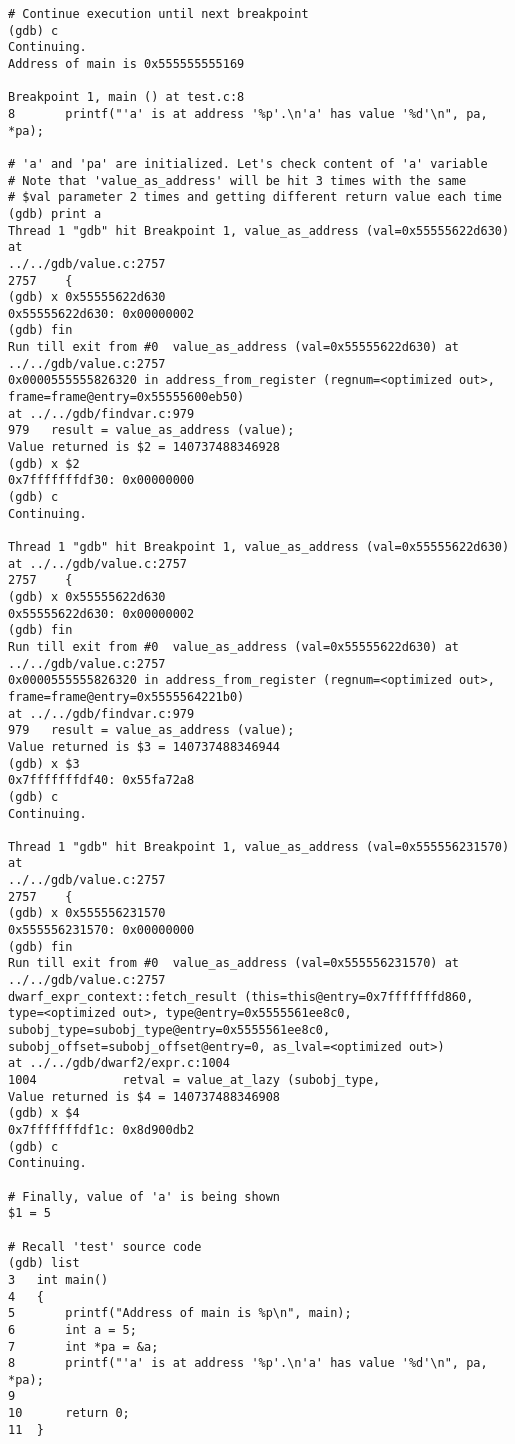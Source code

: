 \documentclass{report}
\begin{document}
\begin{verbatim}
# Continue execution until next breakpoint
(gdb) c
Continuing.
Address of main is 0x555555555169

Breakpoint 1, main () at test.c:8
8		printf("'a' is at address '%p'.\n'a' has value '%d'\n", pa, *pa);

# 'a' and 'pa' are initialized. Let's check content of 'a' variable
# Note that 'value_as_address' will be hit 3 times with the same
# $val parameter 2 times and getting different return value each time
(gdb) print a
Thread 1 "gdb" hit Breakpoint 1, value_as_address (val=0x55555622d630) at 
../../gdb/value.c:2757
2757	{
(gdb) x 0x55555622d630
0x55555622d630:	0x00000002
(gdb) fin
Run till exit from #0  value_as_address (val=0x55555622d630) at 
../../gdb/value.c:2757
0x0000555555826320 in address_from_register (regnum=<optimized out>, 
frame=frame@entry=0x55555600eb50)
at ../../gdb/findvar.c:979
979	  result = value_as_address (value);
Value returned is $2 = 140737488346928
(gdb) x $2
0x7fffffffdf30:	0x00000000
(gdb) c
Continuing.

Thread 1 "gdb" hit Breakpoint 1, value_as_address (val=0x55555622d630) 
at ../../gdb/value.c:2757
2757	{
(gdb) x 0x55555622d630
0x55555622d630:	0x00000002
(gdb) fin
Run till exit from #0  value_as_address (val=0x55555622d630) at 
../../gdb/value.c:2757
0x0000555555826320 in address_from_register (regnum=<optimized out>, 
frame=frame@entry=0x5555564221b0)
at ../../gdb/findvar.c:979
979	  result = value_as_address (value);
Value returned is $3 = 140737488346944
(gdb) x $3
0x7fffffffdf40:	0x55fa72a8
(gdb) c
Continuing.

Thread 1 "gdb" hit Breakpoint 1, value_as_address (val=0x555556231570) at 
../../gdb/value.c:2757
2757	{
(gdb) x 0x555556231570
0x555556231570:	0x00000000
(gdb) fin
Run till exit from #0  value_as_address (val=0x555556231570) at 
../../gdb/value.c:2757
dwarf_expr_context::fetch_result (this=this@entry=0x7fffffffd860, 
type=<optimized out>, type@entry=0x5555561ee8c0, 
subobj_type=subobj_type@entry=0x5555561ee8c0, 
subobj_offset=subobj_offset@entry=0, as_lval=<optimized out>)
at ../../gdb/dwarf2/expr.c:1004
1004		    retval = value_at_lazy (subobj_type,
Value returned is $4 = 140737488346908
(gdb) x $4
0x7fffffffdf1c:	0x8d900db2
(gdb) c
Continuing.

# Finally, value of 'a' is being shown
$1 = 5

# Recall 'test' source code
(gdb) list
3	int main()
4	{
5		printf("Address of main is %p\n", main);
6		int a = 5;
7		int *pa = &a;
8		printf("'a' is at address '%p'.\n'a' has value '%d'\n", pa, *pa);
9	
10		return 0;
11	}


\end{verbatim}
\end{document}
